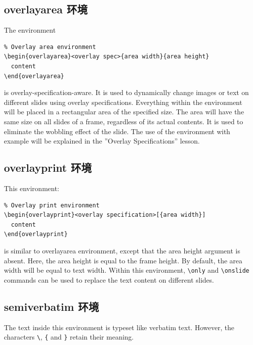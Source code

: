 \subsection{{\ttfamily overlayarea} 环境}

The environment

\begin{verbatim}
% Overlay area environment
\begin{overlayarea}<overlay spec>{area width}{area height}
  content
\end{overlayarea}
\end{verbatim}

is overlay-specification-aware. It is used to dynamically change images or text on different slides using overlay specifications. Everything within the environment will be placed in a rectangular area of the specified size. The area will have the same size on all slides of a frame, regardless of its actual contents. It is used to eliminate the wobbling effect of the slide. The use of the environment with example will be explained in the ”Overlay Specifications” lesson.

\subsection{{\ttfamily overlayprint} 环境}

This environment:

\begin{verbatim}
% Overlay print environment
\begin{overlayprint}<overlay specification>[{area width}]
  content
\end{overlayprint}
\end{verbatim}

is similar to overlayarea environment, except that the area height argument is absent. Here, the area height is equal to the frame height. By default, the area width will be equal to text width. Within this environment, \verb|\only| and \verb|\onslide| commands can be used to replace the text content on different slides.

\subsection{{\ttfamily semiverbatim} 环境}

The text inside this environment is typeset like verbatim text. However, the characters \verb|\|, \verb|{| and \verb|}| retain their meaning.

